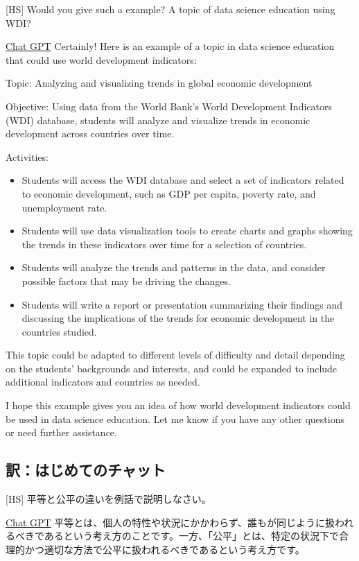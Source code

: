 \documentclass[
]{book}
\providecommand{\tightlist}{%
  \setlength{\itemsep}{0pt}\setlength{\parskip}{0pt}}
\theoremstyle{definition}
\theoremstyle{definition}
\theoremstyle{definition}
\theoremstyle{definition}
\theoremstyle{remark}
\begin{document}
{[}HS{]} Would you give such a example? A topic of data science education using WDI?

\protect\hyperlink{chatgpt}{Chat GPT} Certainly! Here is an example of a topic in data science education that could use world development indicators:

Topic: Analyzing and visualizing trends in global economic development

Objective: Using data from the World Bank's World Development Indicators (WDI) database, students will analyze and visualize trends in economic development across countries over time.

Activities:

\begin{itemize}
\tightlist
\item
  Students will access the WDI database and select a set of indicators related to economic development, such as GDP per capita, poverty rate, and unemployment rate.
\item
  Students will use data visualization tools to create charts and graphs showing the trends in these indicators over time for a selection of countries.
\item
  Students will analyze the trends and patterns in the data, and consider possible factors that may be driving the changes.
\item
  Students will write a report or presentation summarizing their findings and discussing the implications of the trends for economic development in the countries studied.
\end{itemize}

This topic could be adapted to different levels of difficulty and detail depending on the students' backgrounds and interests, and could be expanded to include additional indicators and countries as needed.

I hope this example gives you an idea of how world development indicators could be used in data science education. Let me know if you have any other questions or need further assistance.

\hypertarget{firstchatj}{%
\subsection{訳：はじめてのチャット}\label{firstchatj}}

{[}HS{]} 平等と公平の違いを例話で説明しなさい。

\protect\hyperlink{chatgpt}{Chat GPT} 平等とは、個人の特性や状況にかかわらず、誰もが同じように扱われるべきであるという考え方のことです。一方、「公平」とは、特定の状況下で合理的かつ適切な方法で公平に扱われるべきであるという考え方です。
\end{document}
